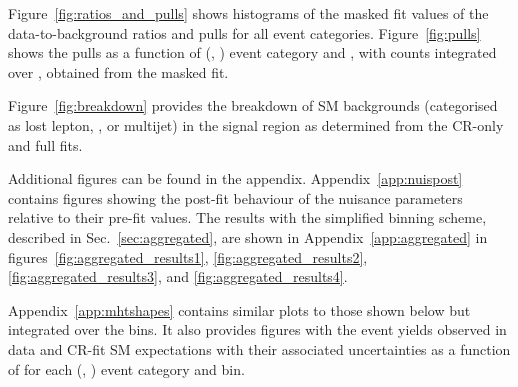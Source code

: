 
Figure~\ref{fig:ratios_and_pulls} shows histograms of the masked fit
values of the data-to-background ratios and pulls for all event
categories. Figure~\ref{fig:pulls} shows the pulls as a function of
(\njet, \nb) event category and \scalht, with counts integrated over
\mht, obtained from the masked fit.

Figure~\ref{fig:breakdown} provides the breakdown of SM backgrounds
(categorised as lost lepton, \znunuj, or multijet) in the signal
region as determined from the CR-only and full fits.

Additional figures can be found in the appendix.
Appendix~\ref{app:nuispost}
contains figures showing the post-fit behaviour of the nuisance
parameters relative to their pre-fit values.
The results with the simplified binning scheme, described in
Sec.~\ref{sec:aggregated}, are shown in Appendix~\ref{app:aggregated} in
figures~\ref{fig:aggregated_results1},
\ref{fig:aggregated_results2}, \ref{fig:aggregated_results3}, and
\ref{fig:aggregated_results4}.

Appendix~\ref{app:mhtshapes} contains similar plots to those shown below but 
integrated over the \HTmiss bins.  It also provides figures with the event
yields observed in data and CR-fit SM expectations with their
associated uncertainties as a function of \HTmiss for each (\njet,
\nb) event category and \scalht bin.

